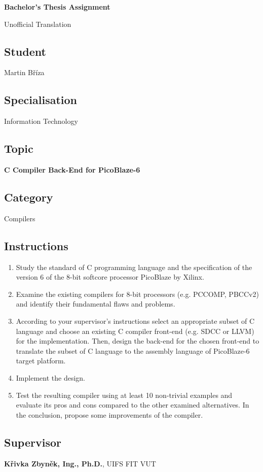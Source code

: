
\begin{center}
\textbf{\huge Bachelor's Thesis Assignment}

\Large Unofficial Translation
\end{center}


\subsection*{Student}
Martin Bříza

\subsection*{Specialisation}
Information Technology

\subsection*{Topic}
\textbf{C Compiler Back-End for PicoBlaze-6}

\subsection*{Category}
Compilers


\subsection*{Instructions}
\begin{enumerate}
	\item Study the standard of C programming language and the specification of the version 6 of the 8-bit softcore processor PicoBlaze by Xilinx.
	\item Examine the existing compilers for 8-bit processors (e.g. PCCOMP, PBCCv2) and identify their fundamental flaws and problems. 
	\item According to your supervisor's instructions select an appropriate subset of C language and choose an existing C compiler front-end (e.g. SDCC or LLVM) for the implementation. Then, design the back-end for the chosen front-end to translate the subset of C language to the assembly language of PicoBlaze-6 target platform.  
	\item Implement the design.  
	\item Test the resulting compiler using at least 10 non-trivial examples and evaluate its pros and cons compared to the other examined alternatives. In the conclusion, propose some improvements of the compiler.
\end{enumerate}

\subsection*{Supervisor}
\textbf{Křivka Zbyněk, Ing., Ph.D.}, UIFS FIT VUT



